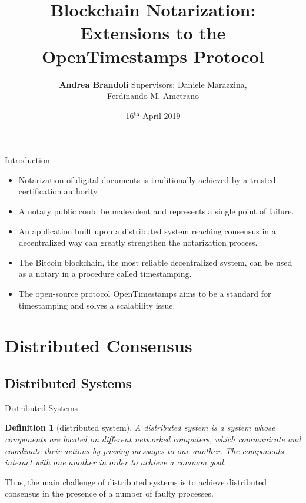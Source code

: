 \documentclass[usenames,dvipsnames]{beamer}
\title{Blockchain Notarization: Extensions to the OpenTimestamps Protocol}
\author{\textbf{Andrea Brandoli} \qquad \qquad \qquad 
Supervisors: Daniele Marazzina,\\ \hspace*{6.78cm} Ferdinando M. Ametrano}
\date{16$^{\text{th}}$ April 2019}
\newtheorem{mydef}{\alert{Definition}}[section]
\begin{document}

    \begin{frame}
        \titlepage
    \end{frame}
    
    \begin{frame}{Introduction}
        \begin{itemize}
            \item \alert{Notarization} of digital documents is traditionally achieved by a trusted certification authority.
            \item A notary public could be malevolent and represents a \alert{single point of failure}.
            \item An application built upon a \alert{distributed system} reaching consensus in a \alert{decentralized way} can greatly strengthen the notarization process.
            \item The Bitcoin blockchain, the most reliable decentralized system, can be used as a notary in a procedure called \alert{timestamping}.
            \item The open-source protocol \alert{OpenTimestamps} aims to be a standard for timestamping and solves a scalability issue.
        \end{itemize}
    \end{frame}
    
    \section{Distributed Consensus}
    \subsection{Distributed Systems}
    \begin{frame}{Distributed Systems}
       \begin{mydef}[distributed system]
       A distributed system is a system whose components are located on different networked computers, which communicate and coordinate their actions by passing messages to one another. The components interact with one another in order to achieve a common goal.
       \end{mydef}
       Thus, the main challenge of distributed systems is to achieve \alert{distributed consensus} in the presence of a number of \alert{faulty processes}.
       
    \end{frame}
     
\end{document}
